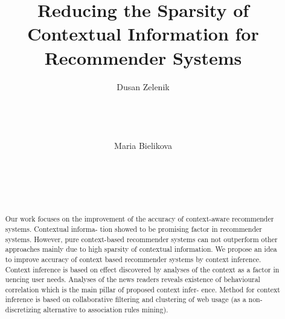 \documentclass{acm_proc_article-sp} %
\begin{document}
\title{Reducing the Sparsity of Contextual Information for
Recommender Systems}


\author{
\alignauthor
Dusan Zelenik\\
       \\
       \\
       \\
       \\
\alignauthor
Maria Bielikova\\
       \\
       \\
       \\
       \\
}

\maketitle

\begin{abstract}
Our work focuses on the improvement of the accuracy of
context-aware recommender systems. Contextual informa-
tion showed to be promising factor in recommender systems.
However, pure context-based recommender systems can not
outperform other approaches mainly due to high sparsity
of contextual information. We propose an idea to improve
accuracy of context based recommender systems by context
inference. Context inference is based on effect discovered
by analyses of the context as a factor in
uencing user needs.
Analyses of the news readers reveals existence of behavioural
correlation which is the main pillar of proposed context infer-
ence. Method for context inference is based on collaborative
filtering and clustering of web usage (as a non-discretizing
alternative to association rules mining).
\end{abstract}



\end{document}
